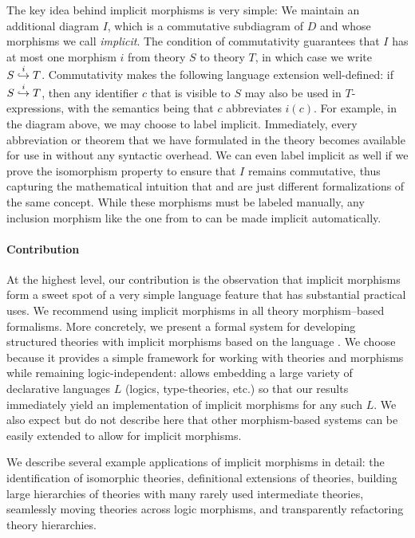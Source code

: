 The key idea behind implicit morphisms is very simple:
We maintain an additional diagram $I$, which is a commutative subdiagram of $D$ and whose morphisms we call \emph{implicit}.
The condition of commutativity guarantees that $I$ has at most one morphism $i$ from theory $S$ to theory $T$, in which case we write $\ipc{i}{S}{T}$.
Commutativity makes the following language extension well-defined: if $\ipc{i}{S}{T}$, then any identifier $c$ that is visible to $S$ may also be used in $T$-expressions, with the semantics being that $c$ abbreviates $i(c)$.
For example, in the diagram above, we may choose to label  implicit.
Immediately, every abbreviation or theorem that we have formulated in the theory  becomes available for use in  without any syntactic overhead.
We can even label  implicit as well if we prove the isomorphism property to ensure that $I$ remains commutative, thus capturing the mathematical intuition that  and  are just different formalizations of the same concept.
While these morphisms must be labeled manually, any inclusion morphism like the one from  to  can be made implicit automatically.

\paragraph{Contribution}
At the highest level, our contribution is the observation that implicit morphisms form a sweet spot of a very simple language feature that has substantial practical uses.
We recommend using implicit morphisms in all theory morphism--based formalisms.
More concretely, we present a formal system for developing structured theories with implicit morphisms based on the \mmt language \cite{RK:mmt:10}.
We choose \mmt because it provides a simple framework for working with theories and morphisms while remaining logic-independent: \mmt allows embedding a large variety of declarative languages $L$ (logics, type-theories, etc.) so that our results immediately yield an implementation of implicit morphisms for any such $L$.
We also expect but do not describe here that other morphism-based systems can be easily extended to allow for implicit morphisms.

We describe several example applications of implicit morphisms in detail: the identification of isomorphic theories, definitional extensions of theories, building large hierarchies of theories with many rarely used intermediate theories, seamlessly moving theories across logic morphisms, and transparently refactoring theory hierarchies.

